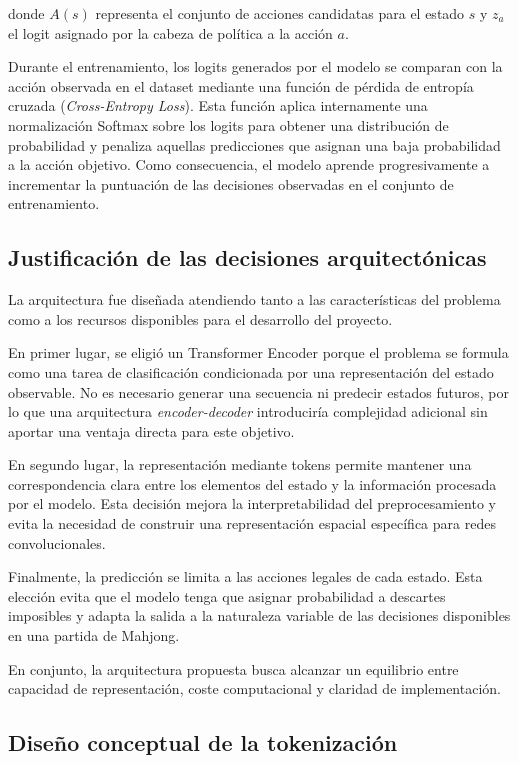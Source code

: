 donde $A(s)$ representa el conjunto de acciones candidatas para el estado $s$ y $z_a$ el logit asignado por la cabeza de política a la acción $a$.

Durante el entrenamiento, los logits generados por el modelo se comparan con la acción observada en el dataset mediante una función de pérdida de entropía cruzada (\textit{Cross-Entropy Loss})\cite{goodfellow2016deep}. Esta función aplica internamente una normalización Softmax sobre los logits para obtener una distribución de probabilidad y penaliza aquellas predicciones que asignan una baja probabilidad a la acción objetivo. Como consecuencia, el modelo aprende progresivamente a incrementar la puntuación de las decisiones observadas en el conjunto de entrenamiento.

\subsection{Justificación de las decisiones arquitectónicas}

La arquitectura fue diseñada atendiendo tanto a las características del problema como a los recursos disponibles para el desarrollo del proyecto.

En primer lugar, se eligió un Transformer Encoder porque el problema se formula como una tarea de clasificación condicionada por una representación del estado observable. No es necesario generar una secuencia ni predecir estados futuros, por lo que una arquitectura \textit{encoder-decoder} introduciría complejidad adicional sin aportar una ventaja directa para este objetivo.

En segundo lugar, la representación mediante tokens permite mantener una correspondencia clara entre los elementos del estado y la información procesada por el modelo. Esta decisión mejora la interpretabilidad del preprocesamiento y evita la necesidad de construir una representación espacial específica para redes convolucionales.

Finalmente, la predicción se limita a las acciones legales de cada estado. Esta elección evita que el modelo tenga que asignar probabilidad a descartes imposibles y adapta la salida a la naturaleza variable de las decisiones disponibles en una partida de Mahjong.

En conjunto, la arquitectura propuesta busca alcanzar un equilibrio entre capacidad de representación, coste computacional y claridad de implementación.


\subsection{Diseño conceptual de la tokenización}
\label{subsec:tokenization}

